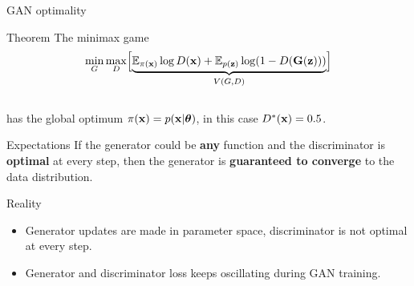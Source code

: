 \begin{frame}{GAN optimality}
	\begin{block}{Theorem}
		The minimax game 
		\vspace{-0.3cm}
		\[
		\min_{G} \max_D \Bigl[ \underbrace{\mathbb{E}_{\pi(\mathbf{x})} \log D(\mathbf{x}) + \mathbb{E}_{p(\mathbf{z})} \log (1 - D(\mathbf{G}(\mathbf{z})))}_{V(G, D)} \Bigr]
		\]
		\vspace{-0.5cm} \\
		has the global optimum $\pi(\mathbf{x}) = p(\mathbf{x} | \boldsymbol{\theta})$, in this case $D^*(\mathbf{x}) = 0.5$.
	\end{block}
	\vspace{-0.2cm}
	\begin{block}{Expectations}
		If the generator could be \textbf{any} function and the discriminator is \textbf{optimal} at every step, then the generator is \textbf{guaranteed to converge} to the data distribution.
	\end{block}
	\begin{block}{Reality}
		\begin{itemize}
			\item Generator updates are made in parameter space, discriminator is not optimal at every step.
			\item Generator and discriminator loss keeps oscillating during GAN training.
		\end{itemize}
	\end{block}
\end{frame}

